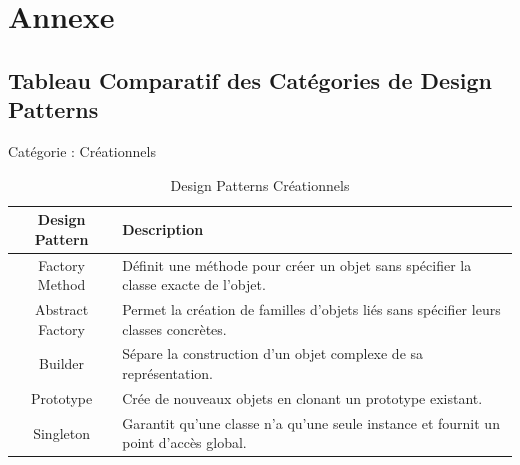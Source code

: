 \documentclass[aspectratio=169]{beamer}
\begin{document}
\section{Annexe}
\subsection{Tableau Comparatif des Catégories de Design Patterns}
\begin{frame}{Catégorie : Créationnels}
    \begin{table}[]
        \centering
        \begin{tabular}{|c|p{8cm}|}
            \hline
            \textbf{Design Pattern} & \textbf{Description}                                                                 \\ \hline
            Factory Method          & Définit une méthode pour créer un objet sans spécifier la classe exacte de l'objet.  \\ \hline
            Abstract Factory        & Permet la création de familles d'objets liés sans spécifier leurs classes concrètes. \\ \hline
            Builder                 & Sépare la construction d'un objet complexe de sa représentation.                     \\ \hline
            Prototype               & Crée de nouveaux objets en clonant un prototype existant.                            \\ \hline
            Singleton               & Garantit qu'une classe n'a qu'une seule instance et fournit un point d'accès global. \\ \hline
        \end{tabular}
        \caption{Design Patterns Créationnels}
    \end{table}
\end{frame}
\end{document}
